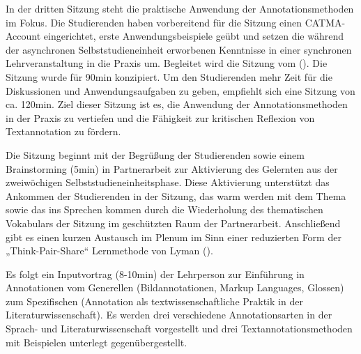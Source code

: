 \documentclass[
          a4paper,
        ]{article}
\begin{document}
In der dritten Sitzung steht die praktische Anwendung der
Annotationsmethoden im Fokus. Die Studierenden haben vorbereitend für
die Sitzung einen CATMA-Account eingerichtet, erste Anwendungsbeispiele
geübt und setzen die während der asynchronen Selbststudieneinheit
erworbenen Kenntnisse in einer synchronen Lehrveranstaltung in die
Praxis um. Begleitet wird die Sitzung vom
().
Die Sitzung wurde für 90min konzipiert. Um den Studierenden mehr Zeit
für die Diskussionen und Anwendungsaufgaben zu geben, empfiehlt sich
eine Sitzung von ca. 120min. Ziel dieser Sitzung ist es, die Anwendung
der Annotationsmethoden in der Praxis zu vertiefen und die Fähigkeit zur
kritischen Reflexion von Textannotation zu fördern.

Die Sitzung beginnt mit der Begrüßung der Studierenden sowie einem
Brainstorming (5min) in Partnerarbeit zur Aktivierung des Gelernten aus
der zweiwöchigen Selbststudieneinheitsphase. Diese Aktivierung
unterstützt das Ankommen der Studierenden in der Sitzung, das warm
werden mit dem Thema sowie das ins Sprechen kommen durch die
Wiederholung des thematischen Vokabulars der Sitzung im geschützten Raum
der Partnerarbeit. Anschließend gibt es einen kurzen Austausch im Plenum
im Sinn einer reduzierten Form der „Think-Pair-Share`` Lernmethode von
Lyman ().

Es folgt ein Inputvortrag (8-10min) der Lehrperson zur Einführung in
Annotationen vom Generellen (Bildannotationen, Markup Languages,
Glossen) zum Spezifischen (Annotation als textwissenschaftliche Praktik
in der Literaturwissenschaft). Es werden drei verschiedene
Annotationsarten in der Sprach- und Literaturwissenschaft vorgestellt
und drei Textannotationsmethoden mit Beispielen unterlegt
gegenübergestellt.
\end{document}
